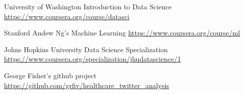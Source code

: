 \documentclass{article}
\begin{document}
\begin{thebibliography}{1}

 University of Washington Introduction to Data Science \url{https://www.coursera.org/course/datasci}

 Stanford Andew Ng's Machine Learning \url{https://www.coursera.org/course/ml}

 Johns Hopkins University Data Science Specialization \url{https://www.coursera.org/specialization/jhudatascience/1}

 George Fisher's github project \url{https://github.com/grfiv/healthcare_twitter_analysis}

\end{thebibliography}
\end{document}

